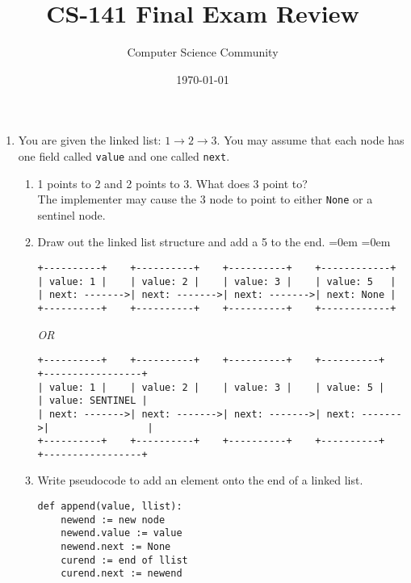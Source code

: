 \documentclass[11pt]{article}
\author{Computer Science Community}
\title{CS-141 Final Exam Review}
\date{\today}
\newenvironment{answer}{\large\lstset{basicstyle=\large}\color{white}}{}
\newenvironment{answer}{\large\lstset{basicstyle=\large}\color{red}}{}
\begin{document}
\header

\begin{enumerate}


\section*{Linked Lists}
    \item You are given the linked list: $1 \rightarrow 2 \rightarrow 3$.  You may assume that each node has one field called \texttt{value} and one called \texttt{next}.
        \begin{enumerate}
            \item 1 points to 2 and 2 points to 3. What does 3 point to? \\
                \begin{answer}
				The implementer may cause the 3 node to point to either \texttt{None} or a sentinel node.
				\end{answer}
            \item Draw out the linked list structure and add a 5 to the end.
				\begin{answer}
				\leftmargin=0em
				\itemindent=0em
				{ \small
				\begin{verbatim}
+----------+    +----------+    +----------+    +------------+
| value: 1 |    | value: 2 |    | value: 3 |    | value: 5   |
| next: ------->| next: ------->| next: ------->| next: None |
+----------+    +----------+    +----------+    +------------+
				\end{verbatim}
				\textit{OR}
				\begin{verbatim}
+----------+    +----------+    +----------+    +----------+    +-----------------+
| value: 1 |    | value: 2 |    | value: 3 |    | value: 5 |    | value: SENTINEL |
| next: ------->| next: ------->| next: ------->| next: ------->|                 |
+----------+    +----------+    +----------+    +----------+    +-----------------+
				\end{verbatim} }
				\end{answer}
            \item Write pseudocode to add an element onto the end of a linked list.
				\begin{answer}
				\begin{lstlisting}
def append(value, llist):
	newend := new node
	newend.value := value
	newend.next := None
	curend := end of llist
	curend.next := newend
				\end{lstlisting}

\end{answer}
\end{enumerate}
\end{enumerate}
\end{document}
